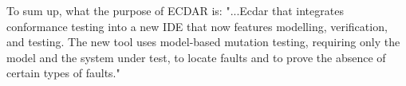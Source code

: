 
To sum up, what the purpose of ECDAR is:
"...Ecdar that integrates conformance testing into a new IDE that now features
modelling, verification, and testing. The new tool uses model-based mutation testing, requiring only
the model and the system under test, to locate faults and to prove the absence of certain types of faults." \cite{Gundersen_2018}

